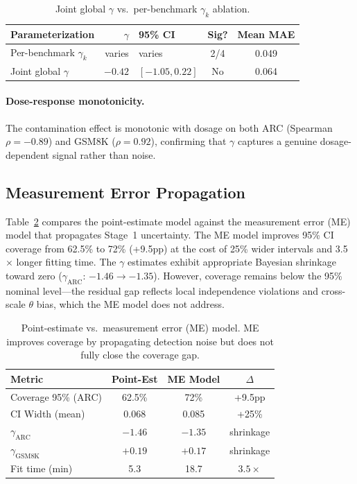 \documentclass[11pt,a4paper]{article}
\begin{document}
\begin{table}[t]
\centering
\caption{Joint global $\gamma$ vs.\ per-benchmark $\gamma_k$ ablation.}
\label{tab:joint_ablation}
\small
\begin{tabular}{lrlcc}
\toprule
Parameterization & $\gamma$ & 95\% CI & Sig? & Mean MAE \\
\midrule
Per-benchmark $\gamma_k$ & varies & varies & 2/4 & 0.049 \\
Joint global $\gamma$    & $-0.42$ & $[-1.05, 0.22]$ & No & 0.064 \\
\bottomrule
\end{tabular}
\end{table}

\paragraph{Dose-response monotonicity.}
The contamination effect is monotonic with dosage on both ARC (Spearman $\rho=-0.89$) and GSM8K ($\rho=0.92$), confirming that $\gamma$ captures a genuine dosage-dependent signal rather than noise.

\subsection{Measurement Error Propagation}
\label{sec:me}

Table~\ref{tab:me_model} compares the point-estimate model against the measurement error (ME) model that propagates Stage~1 uncertainty. The ME model improves 95\% CI coverage from 62.5\% to 72\% (+9.5pp) at the cost of 25\% wider intervals and 3.5$\times$ longer fitting time. The $\gamma$ estimates exhibit appropriate Bayesian shrinkage toward zero ($\gamma_{\text{ARC}}$: $-1.46 \to -1.35$). However, coverage remains below the 95\% nominal level---the residual gap reflects local independence violations and cross-scale $\theta$ bias, which the ME model does not address.

\begin{table}[t]
\centering
\caption{Point-estimate vs.\ measurement error (ME) model. ME improves coverage by propagating detection noise but does not fully close the coverage gap.}
\label{tab:me_model}
\small
\begin{tabular}{lccc}
\toprule
Metric & Point-Est & ME Model & $\Delta$ \\
\midrule
Coverage 95\% (ARC) & 62.5\% & 72\% & +9.5pp \\
CI Width (mean)     & 0.068  & 0.085 & +25\% \\
$\gamma_{\text{ARC}}$     & $-1.46$  & $-1.35$ & shrinkage \\
$\gamma_{\text{GSM8K}}$   & $+0.19$  & $+0.17$ & shrinkage \\
Fit time (min)      & 5.3    & 18.7  & $3.5\times$ \\
\bottomrule
\end{tabular}
\end{table}
\end{document}
